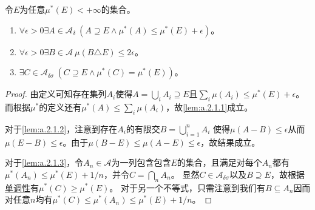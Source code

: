 \documentclass[main.tex]{subfiles}
\begin{document}
\begin{lemma} \label{lem:a.2.1}
	令\(E\)为任意\(\mu^*(E) < +\infty\)的集合。
	\begin{enumerate}
		\item\label{lem:a.2.1.1} \(\forall \epsilon>0 \exists A \in \mathcal{A}_\delta\ (A \supseteq E \wedge \mu^*(A) \leq \mu^*(E)+\epsilon)\)。
		\item\label{lem:a.2.1.2} \(\forall \epsilon > 0 \exists B \in \mathcal{A} \ \mu(B\triangle E) \leq 2\epsilon\)。
		\item\label{lem:a.2.1.3} \(\exists C \in \mathcal{A}_{\delta\sigma}\ (C\supseteq E \wedge \mu^*(C) = \mu^*(E))\)。
	\end{enumerate}
\end{lemma}
\begin{proof}
	由定义可知存在集列\(A_i\)使得\(A = \bigcup_{i} A_i \supseteq E\)且\(\sum_i \mu(A_i) \leq \mu^*(E) + \epsilon\)。而根据\(\mu^*\)的定义还有\(\mu^*(A) \leq \sum_i \mu(A_i)\)，故\ref{lem:a.2.1.1}成立。

	对于\ref{lem:a.2.1.2}，注意到存在\(A_i\)的有限交\(B = \bigcup_{i=1}^n A_i\) 使得\(\mu(A-B) \leq \epsilon\)从而\(\mu(E-B)\leq \epsilon\)。由于\(\mu(B-E)\leq \mu(A-E)\leq \epsilon\)，故结果成立。

	对于\ref{lem:a.2.1.3}，令\(A_n \in \mathcal{A}\)为一列包含包含\(E\)的集合，且满足对每个\(A_n\)都有\(\mu^*(A_n) \leq \mu^*(E)+ 1/n\)，并令\(C = \bigcap_{n} A_n\)。
	显然\(C \in \mathcal{A}_{\delta\sigma}\)以及\(B\supseteq E\)，故根据\hyperref[prop:a.1.monotonicity]{单调性}有\(\mu^*(C) \geq \mu^*(E)\)。
	对于另一个不等式，只需注意到我们有\(B\subseteq A_n\)因而对任意\(n\)均有\(\mu^*(C)\leq \mu^*(A_n) \leq \mu^*(E)+1/n\)。
\end{proof}
\end{document}
